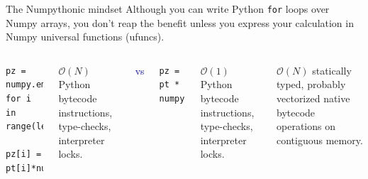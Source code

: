 \documentclass[aspectratio=169]{beamer}
\begin{document}
\begin{frame}[fragile]{The Numpythonic mindset}
\large
\vspace{0.5 cm}
Although you can write Python {\tt\normalsize for} loops over Numpy arrays, you don't reap the benefit unless you express your calculation in Numpy universal functions (ufuncs).

\vspace{\baselineskip}
\begin{columns}[t]
\vspace{-\baselineskip}
\scriptsize
\begin{verbatim}
pz = numpy.empty(len(pt))
for i in range(len(pt)):
    pz[i] = pt[i]*numpy.sinh(eta[i])
\end{verbatim}

\vspace{0.5 cm}
$\mathcal{O}(N)$ Python bytecode instructions, type-checks, interpreter locks.

\mbox{\hspace{-0.85 cm}\textcolor{darkblue}{vs}}
\vspace{-\baselineskip}
\scriptsize
\begin{verbatim}
pz = pt * numpy.sinh(eta)
\end{verbatim}
\vspace{2\baselineskip}

\vspace{0.5 cm}
$\mathcal{O}(1)$ Python bytecode instructions, type-checks, interpreter locks.

\vspace{0.1 cm}
$\mathcal{O}(N)$ statically typed, probably vectorized native bytecode operations on contiguous memory.
\end{columns}

\large
\vspace{0.75 cm}

\vspace{0.1 cm}
\end{frame}
\end{document}
